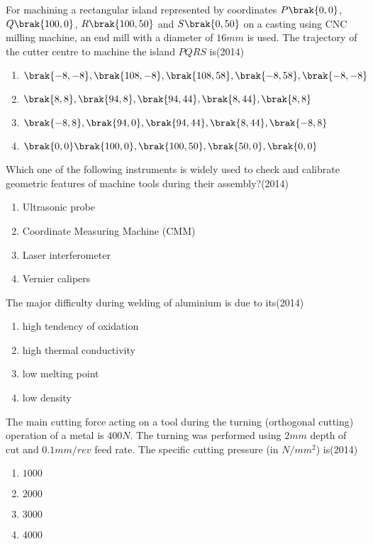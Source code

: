 \item For machining a rectangular island represented by coordinates $P\brak{0,0}$, $Q\brak{100,0}$, $R\brak{100,50}$ and $S\brak{0,50}$ on a casting using CNC milling machine, an end mill with a diameter of $16mm$ is used. The trajectory of the cutter centre to machine the island $PQRS$ is\hfill(2014)
\begin{enumerate}
\item $\brak{-8,-8},\brak{108,-8},\brak{108,58},\brak{-8,58},\brak{-8,-8}$
\item $\brak{8,8},\brak{94,8},\brak{94,44},\brak{8,44},\brak{8,8}$
\item $\brak{-8,8},\brak{94,0},\brak{94,44},\brak{8,44},\brak{-8,8}$
\item $\brak{0,0}\brak{100,0},\brak{100,50},\brak{50,0},\brak{0,0}$
\end{enumerate}

\item Which one of the following instruments is widely used to check and calibrate geometric features of machine tools during their assembly?\hfill(2014)
\begin{enumerate}
\item Ultrasonic probe
\item Coordinate Measuring Machine (CMM)
\item Laser interferometer
\item Vernier calipers
\end{enumerate}


\item The major difficulty during welding of aluminium is due to its\hfill(2014)
\begin{multicols}{2}
\begin{enumerate}
\item high tendency of oxidation
\item high thermal conductivity
\item low melting point
\item low density
\end{enumerate}
\end{multicols}


\item The main cutting force acting on a tool during the turning (orthogonal cutting) operation of a metal is $400N$. The turning was performed using $2mm$ depth of cut and $0.1mm/rev$ feed rate. The specific cutting pressure (in $N/mm^{2}$) is\hfill(2014)
\begin{multicols}{2}
\begin{enumerate}
\item $1000$
\item $2000$
\item $3000$
\item $4000$
\end{enumerate}
\end{multicols}


